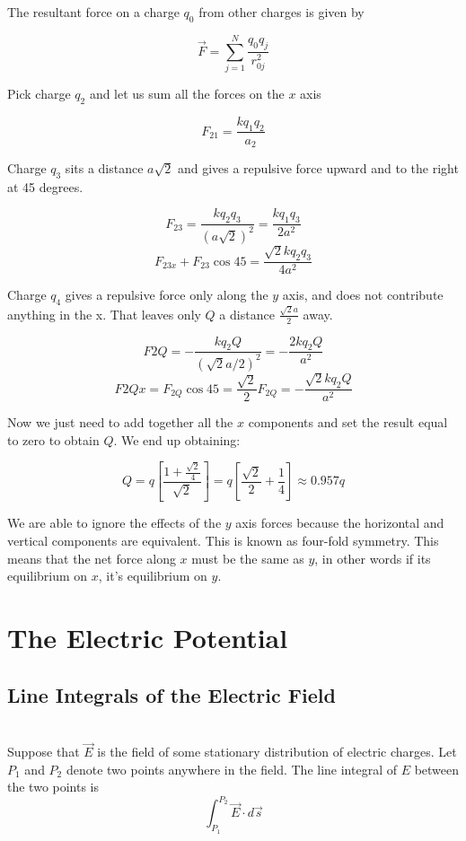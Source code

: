 \documentclass[svgnames]{article}
\begin{document}
The resultant force on a charge $q_0$ from other charges is given by 

\[
  \vec{F} = \sum_{j=1}^{N} \frac{q_0q_j}{r_{0j}^2} 
\]

Pick charge $q_2$ and let us sum all the forces on the $x$ axis

\[
F_{21} = \frac{kq_1q_2}{a_2}
\]

Charge $q_3$ sits a distance $a\sqrt{2}$ and gives a repulsive force upward
and to the right at 45 degrees. 

\[
  F_{23} = \frac{kq_2q_3}{(a\sqrt{2})^2} = \frac{kq_1q_3}{2a^2}
\] 
\[
  F_{23x} + F_{23} \cos 45 = \frac{\sqrt{2}kq_2q_3}{4a^2}
\] 

Charge $q_4$ gives a repulsive force only along the $y$ axis, and does not
contribute anything in the x. That leaves only $Q$ a distance
$\frac{\sqrt{2}a}{2}$ away. 

\[
  F{2Q} = -\frac{kq_2Q}{(\sqrt{2}a/2)^2} = -\frac{2kq_2Q}{a^2}
\] 
\[
  F{2Qx} = F_{2Q} \cos 45 = \frac{\sqrt{2}}{2}F_{2Q}
  = -\frac{\sqrt{2}kq_2Q}{a^2}
\] 

 

Now we just need to add together all the $x$ components and set the result
equal to zero to obtain $Q$. We end up obtaining: 

\[
  Q = q\left[\frac{1+\frac{\sqrt{2}}{4}}{\sqrt{2}}\right]
  = q\left[\frac{\sqrt{2}}{2} + \frac{1}{4}\right] \approx 0.957q
\]

We are able to ignore the effects of the $y$ axis forces because the horizontal
and vertical components are equivalent. This is known as four-fold symmetry.
This means that the net force along $x$ must be the same as $y$, in other words
if its equilibrium on  $x$, it's equilibrium on  $y$. 



\newpage

\section{The Electric Potential} 

\subsection{Line Integrals of the Electric Field} \mbox{} \\

Suppose that $\vec{E}$ is the field of some stationary distribution of electric
charges. Let $P_1$ and $P_2$ denote two points anywhere in the field. The line
integral of $E$ between the two points is 
\[ \int_{P_1}^{P_2} \vec{E} \cdot d\vec{s} \] \\
\end{document}
